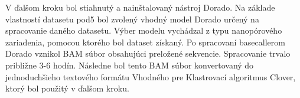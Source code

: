 V ďalšom kroku bol stiahnutý a nainštalovaný nástroj Dorado. Na základe vlastností datasetu pod5 bol zvolený vhodný model Dorado určený na spracovanie daného datasetu.
Výber modelu vychádzal z typu nanopórového zariadenia, pomocou ktorého bol dataset získaný.
Po spracovaní basecallerom Dorado vznikol BAM súbor obsahujúci preložené sekvencie.
Spracovanie trvalo približne 3-6 hodín. %
Následne bol tento BAM súbor konvertovaný do jednoduchšieho textového formátu Vhodného pre Klastrovací algoritmus Clover, ktorý bol použitý v ďalšom kroku.

